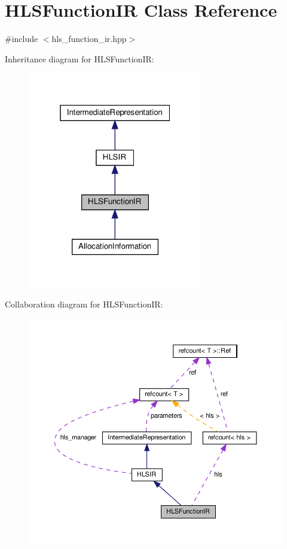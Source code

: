 \hypertarget{classHLSFunctionIR}{}\section{H\+L\+S\+Function\+IR Class Reference}
\label{classHLSFunctionIR}


{\ttfamily \#include $<$hls\+\_\+function\+\_\+ir.\+hpp$>$}



Inheritance diagram for H\+L\+S\+Function\+IR\+:
\nopagebreak
\begin{figure}[H]
\begin{center}
\leavevmode
\includegraphics[width=217pt]{d2/d0d/classHLSFunctionIR__inherit__graph}
\end{center}
\end{figure}


Collaboration diagram for H\+L\+S\+Function\+IR\+:
\nopagebreak
\begin{figure}[H]
\begin{center}
\leavevmode
\includegraphics[width=350pt]{de/d66/classHLSFunctionIR__coll__graph}
\end{center}
\end{figure}
